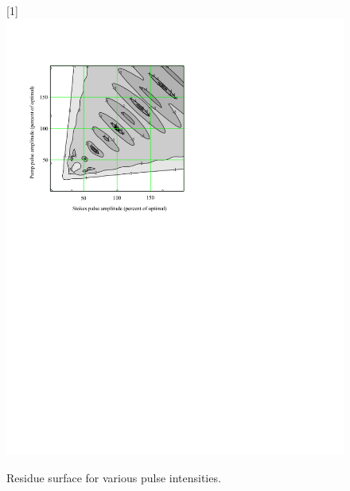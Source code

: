 \begin{figure}
\scalebox{1}[1]{
\includegraphics[bb=-15 450 489 700]
{amp_surface/amp_surface.pdf}
}
\caption[Residue surface for various pulse intensities]{Residue surface for various pulse intensities.}
\label{amp_surface}
\end{figure}
